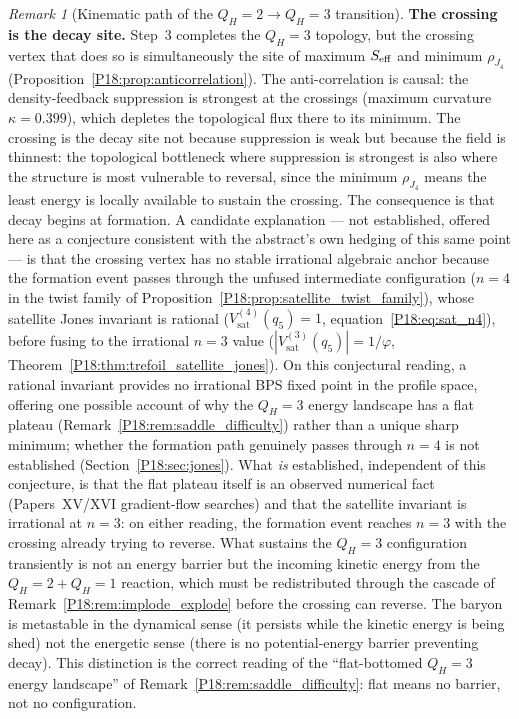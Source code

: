 \documentclass[11pt,a4paper]{article}
\theoremstyle{definition}\newtheorem{definition}[theorem]{Definition}
\theoremstyle{remark}
\newtheorem{remark}[theorem]{Remark}
\newcommand{\vp}{\varphi}
\newcommand{\QH}{Q_H}
\newcommand{\Jones}{V}
\begin{document}
\begin{remark}[Kinematic path of the $\QH=2\to\QH=3$ transition]
\textbf{The crossing is the decay site.}  Step~3 completes the
$\QH=3$ topology, but the crossing vertex that does so is
simultaneously the site of maximum $S_{\rm eff}$ and minimum
$\rho_{J_4}$ (Proposition~\ref{P18:prop:anticorrelation}).  The
anti-correlation is causal: the density-feedback suppression is
strongest at the crossings (maximum curvature $\kappa=0.399$),
which depletes the topological flux there to its minimum.  The
crossing is the decay site not because suppression is weak but
because the field is thinnest: the topological bottleneck where
suppression is strongest is also where the structure is most
vulnerable to reversal, since the minimum $\rho_{J_4}$ means
the least energy is locally available to sustain the crossing.
The consequence is that decay begins at formation.  A candidate
explanation --- not established, offered here as a conjecture
consistent with the abstract's own hedging of this same point --- is
that the crossing vertex has no stable irrational algebraic anchor
because the formation event passes through the unfused intermediate
configuration ($n=4$ in the twist family of
Proposition~\ref{P18:prop:satellite_twist_family}), whose satellite
Jones invariant is rational ($\Jones_{\mathrm{sat}}^{(4)}(q_5)=1$,
equation~\eqref{P18:eq:sat_n4}), before fusing to the irrational
$n=3$ value ($|\Jones_{\mathrm{sat}}^{(3)}(q_5)|=1/\vp$,
Theorem~\ref{P18:thm:trefoil_satellite_jones}).  On this conjectural
reading, a rational invariant provides no irrational BPS fixed point
in the profile space, offering one possible account of why the
$\QH=3$ energy landscape has a flat plateau
(Remark~\ref{P18:rem:saddle_difficulty}) rather than a unique sharp
minimum; whether the formation path genuinely passes through $n=4$ is
not established (Section~\ref{P18:sec:jones}).  What \emph{is}
established, independent of this conjecture, is that the flat plateau
itself is an observed numerical fact (Papers~XV/XVI gradient-flow
searches) and that the satellite invariant is irrational at $n=3$: on
either reading, the formation event reaches $n=3$ with the crossing
already trying to reverse.
What sustains the $\QH=3$ configuration transiently is not an
energy barrier but the incoming kinetic energy from the $\QH=2+\QH=1$
reaction, which must be redistributed through the cascade of
Remark~\ref{P18:rem:implode_explode} before the crossing can reverse.
The baryon is metastable in the dynamical sense (it persists while
the kinetic energy is being shed) not the energetic sense (there is
no potential-energy barrier preventing decay).  This distinction
is the correct reading of the ``flat-bottomed $\QH=3$ energy
landscape'' of Remark~\ref{P18:rem:saddle_difficulty}: flat means no
barrier, not no configuration.
\end{remark}
\end{document}
